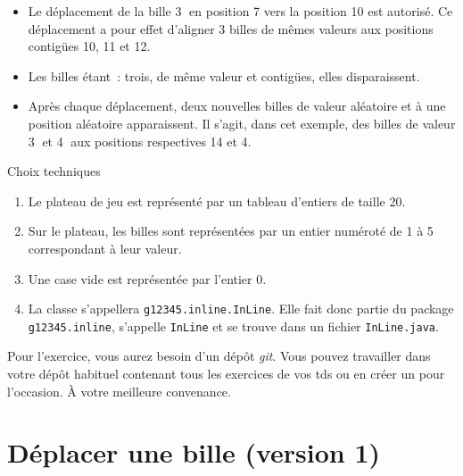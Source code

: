\documentclass[a4paper,11pt]{style-esi/td}
\begin{document}
\begin{itemize}

	\item Le déplacement de la bille \textcircled{\tiny 3} en position 7 vers
		la position 10 est autorisé. Ce déplacement a pour effet d'aligner
		3 billes de mêmes valeurs aux positions contigües 10, 11 et 12.  

	\item Les billes étant : trois, de même valeur et contigües, elles 
		disparaissent. 

	\item Après chaque déplacement, deux nouvelles billes de valeur aléatoire
		et à une position aléatoire apparaissent. Il s'agit, dans cet exemple,
		des billes de valeur \textcircled{\tiny 3} et \textcircled{\tiny 4} aux
		positions respectives 14 et 4.  

\end{itemize}



\begin{infoit}{Choix techniques}
	\begin{enumerate}
		\item Le plateau de jeu est représenté par un tableau d'entiers de 
			taille 20. 
		\item Sur le plateau, les billes sont représentées par un entier 
			numéroté de 1 à 5 correspondant à leur valeur.
		\item Une case vide est représentée par l'entier 0. 
		\item La classe s'appellera \texttt{g12345.inline.InLine}. Elle fait donc
			partie du package \texttt{g12345.inline}, s'appelle \texttt{InLine} et 
			se trouve dans un fichier \texttt{InLine.java}. 
	\end{enumerate}
\end{infoit}


\bigskip
\begin{infobox}
	Pour l'exercice, vous aurez besoin d'un dépôt \textit{git}. Vous pouvez
	travailler dans votre dépôt habituel contenant tous les exercices de vos
	tds ou en créer un pour l'occasion. À votre meilleure convenance. 
\end{infobox}

\bigskip


\section{Déplacer une bille (version 1)}
\end{document}
